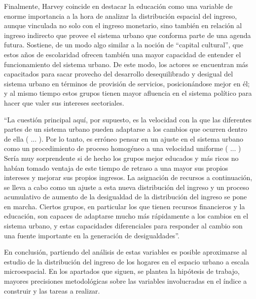 Finalmente, Harvey coincide en destacar la educación como una variable de enorme importancia a la hora de analizar la distribución espacial del ingreso, aunque vinculada no solo con el ingreso monetario, sino también en relación al ingreso indirecto que provee el sistema urbano que conforma parte de una agenda futura. Sostiene, de un modo algo similar a la noción de “capital cultural”, que estos años de escolaridad ofrecen también una mayor capacidad de entender el funcionamiento del sistema urbano. De este modo, los actores se encuentran más capacitados para sacar provecho del desarrollo desequilibrado y desigual del sistema urbano en términos de provisión de servicios, posicionándose mejor en él; y al mismo tiempo estos grupos tienen mayor afluencia en el sistema político para hacer que valer sus intereses sectoriales.
	
“La cuestión principal aquí, por supuesto, es la velocidad con la que las diferentes partes de un sistema urbano pueden adaptarse a los cambios que ocurren dentro de ella ( ... ). Por lo tanto, es erróneo pensar en un ajuste en el sistema urbano como un procedimiento de proceso homogéneo a una velocidad uniforme ( ... ) Sería muy sorprendente si de hecho los grupos mejor educados y más ricos no habían tomado ventaja de este tiempo de retraso a una mayor sus propios intereses y mejorar sus propios ingresos. La asignación de recursos a continuación, se lleva a cabo como un ajuste a esta nueva distribución del ingreso y un proceso acumulativo de aumento de la desigualdad de la distribución del ingreso se pone en marcha. Ciertos grupos, en particular los que tienen recursos financieros y la educación, son capaces de adaptarse mucho más rápidamente a los cambios en el sistema urbano, y estas capacidades diferenciales para responder al cambio son una fuente importante en la generación de desigualdades”\cite[~56]{harvey}.
	
En conclusión, partiendo del análisis de estas variables es posible aproximarse al estudio de la distribución del ingreso de los hogares en el espacio urbano a escala microespacial. En los apartados que siguen, se plantea la hipótesis de trabajo, mayores precisiones metodológicas sobre las variables involucradas en el índice a construir y las tareas a realizar.
	
	
	
